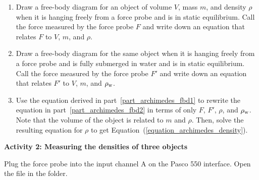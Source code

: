 \begin{enumerate}[labparts]
\item Draw a free-body diagram for an object of volume $V$, mass $m$, and density $\rho$ when it is hanging freely from a force probe and is in static equilibrium. Call the force measured by the force probe $F$ and write down an equation that relates $F$ to $V$, $m$, and $\rho$.
\label{part_archimedes_fbd1}
\answerspace{2in}

\item Draw a free-body diagram for the same object when it is hanging freely from a force probe and is fully submerged in water and is in static equilibrium. Call the force measured by the force probe $F'$ and write down an equation that relates   $F'$ to $V$, $m$, and  $\rho_{\rm w}$.
\label{part_archimedes_fbd2}
\answerspace{2in}

\item Use the equation derived in part~\ref{part_archimedes_fbd1} to rewrite the equation in part~\ref{part_archimedes_fbd2} in terms of only $F$, $F'$, $\rho$, and 
$\rho_{\rm w}$. Note that the volume of the object is related to $m$ and $\rho$. 
Then, solve the resulting equation for $\rho$ to get Equation~(\ref{equation_archimedes_density}).
\answerspace{2in}

\end{enumerate}

\textbf{Activity 2: Measuring the densities of three objects}

Plug the force probe into the input channel A on the Pasco 550 interface. Open the file  in the \filename{\coursefolder} folder. 

